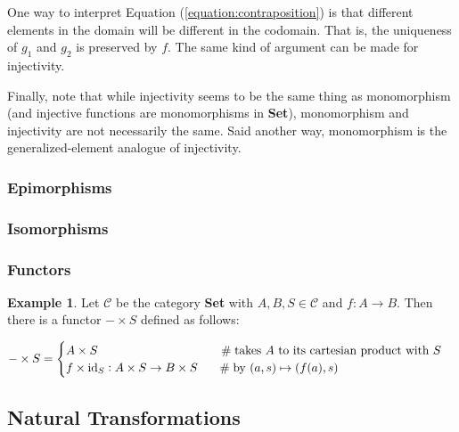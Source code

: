 \documentclass{article}
\theoremstyle{definition}
\newtheorem{example}{Example}[section]
\begin{document}
\bigskip
\noindent
One way to interpret Equation (\ref{equation:contraposition}) is
that different elements in the domain will be different in the
codomain. That is, the uniqueness of $g_{1}$ and $g_{2}$ is
preserved by $f$. The same kind of argument can be made for
injectivity.


\bigskip
\noindent
Finally, note that while injectivity seems to be the same thing
as monomorphism (and injective functions are monomorphisms in
{\bf Set}), monomorphism and injectivity are not necessarily the
same.  Said another way, monomorphism is the generalized-element
analogue of injectivity.

\subsubsection{Epimorphisms}
\label{subsubsection:epimorphisms}

\subsubsection{Isomorphisms}
\label{subsubsection:isomorphisms}

\subsubsection{Functors}
\label{subsubsection:functors}

\vspace{1.0em}
\begin{example}
Let $\mathcal{C}$ be the category {\bf Set} with $A,B,S \in 
\mathcal{C}$ and $f: A \to B$. Then there is a 
functor $- \times S$ defined as follows:


\bigskip
\begin{math}
   - \times S =
   \begin{cases} 
      A \times S                                        
      		\hspace{10.0em} \mathrel{\#} \text{takes $A$ to its cartesian product with $S$} \\
      f \times \text{id}_{S}: A \times S \to B \times S 
      		\hspace{1.55em} \mathrel{\#} \text{by $(a,s) \mapsto (f(a),s)$}
   \end{cases}
\end{math}
\label{example:functor}
\end{example}


\subsection{Natural Transformations}
\label{subsection:naturl_transformations}
\end{document}
